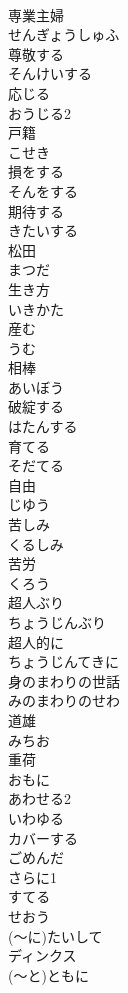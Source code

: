 \documentclass[8pt]{extreport}
\begin{document}
\begin{CJK}{UTF8}{min}
\\	専業主婦	
\\	せんぎょうしゅふ
\\	尊敬する	
\\	そんけいする
\\	応じる	
\\	おうじる2
\\	戸籍	
\\	こせき
\\	損をする	
\\	そんをする
\\	期待する	
\\	きたいする
\\	松田	
\\	まつだ
\\	生き方	
\\	いきかた
\\	産む	
\\	うむ
\\	相棒	
\\	あいぼう
\\	破綻する	
\\	はたんする
\\	育てる	
\\	そだてる
\\	自由	
\\	じゆう
\\	苦しみ	
\\	くるしみ
\\	苦労	
\\	くろう
\\	超人ぶり	
\\	ちょうじんぶり
\\	超人的に	
\\	ちょうじんてきに
\\	身のまわりの世話	
\\	みのまわりのせわ
\\	道雄	
\\	みちお
\\	重荷	
\\	おもに
\\	あわせる2	
\\	いわゆる	
\\	カバーする	
\\	ごめんだ	
\\	さらに1	
\\	すてる	
\\	せおう	
\\	(～に)たいして	
\\	ディンクス	
\\	(～と)ともに	

\end{CJK}
\end{document}

